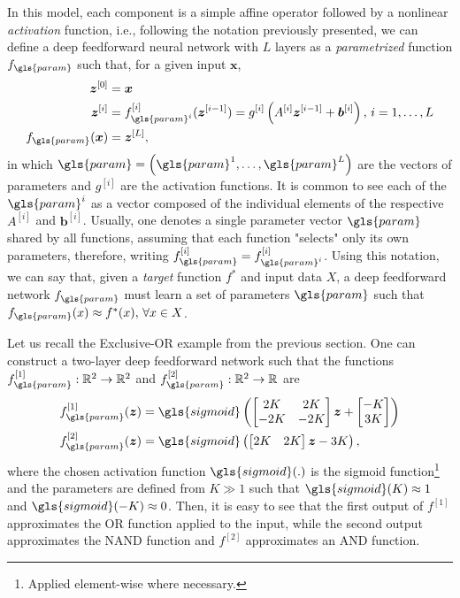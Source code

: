 In this model, each component is a simple affine operator followed by a nonlinear \textit{activation} function, i.e., following the notation previously presented, we can define a deep feedforward neural network with $L$ layers as a \textit{parametrized} function $f_{\gls{param}}$ such that, for a given input $\bm{x}$,
\begin{align*}
    \bm{z}^{[0]} &= \bm{x} \\
    \bm{z}^{[i]} &= f_{\gls{param}^i}^{[i]}(\bm{z}^{[i-1]}) = g^{[i]}\left(A^{[i]}\bm{z}^{[i-1]} + \bm{b}^{[i]}\right) ,\,i=1,\ldots,L \\
    f_{\gls{param}}(\bm{x}) &= \bm{z}^{[L]}
,\end{align*}
in which $\gls{param}=\left( \gls{param}^1,\ldots,\gls{param}^L \right) $ are the vectors of parameters and $g^{[i]}$ are the activation functions.
It is common to see each of the $\gls{param}^i$ as a vector composed of the individual elements of the respective $A^{[i]}$ and $\bm{b}^{[i]}$.
Usually, one denotes a single parameter vector $\gls{param}$ shared by all functions, assuming that each function "selects" only its own parameters, therefore, writing $f_{\gls{param}}^{[i]} = f_{\gls{param}^i}^{[i]}$.
Using this notation, we can say that, given a \textit{target} function $f^*$ and input data $X$, a deep feedforward network $f_{\gls{param}}$ must learn a set of parameters $\gls{param}$ such that $f_{\gls{param}}(x) \approx f^*(x),\,\forall x \in X$.

Let us recall the Exclusive-OR example from the previous section. One can construct a two-layer deep feedforward network such that the functions $f_{\gls{param}}^{[1]}:\R^2\to\R^2$ and $f_{\gls{param}}^{[2]}:\R^2\to\R$ are
\begin{align*}
    f_{\gls{param}}^{[1]}(\bm{z}) &= \gls{sigmoid}\left(
    \begin{bmatrix}
    2K & 2K \\
    -2K & -2K
    \end{bmatrix}\bm{z} + \begin{bmatrix}
    -K \\
    3K
    \end{bmatrix}\right) \\
    f_{\gls{param}}^{[2]}(\bm{z}) &= \gls{sigmoid}\left(
    \begin{bmatrix}
    2K & 2K
    \end{bmatrix}\bm{z} - 3K\right)
,\end{align*}
where the chosen activation function $\gls{sigmoid}(.)$ is the sigmoid function\footnote{Applied element-wise where necessary.} and the parameters are defined from $K \gg 1$ such that $\gls{sigmoid}(K) \approx 1$ and $\gls{sigmoid}(-K) \approx 0$.
Then, it is easy to see that the first output of $f^{[1]}$ approximates the OR function applied to the input, while the second output approximates the NAND function and $f^{[2]}$ approximates an AND function.


